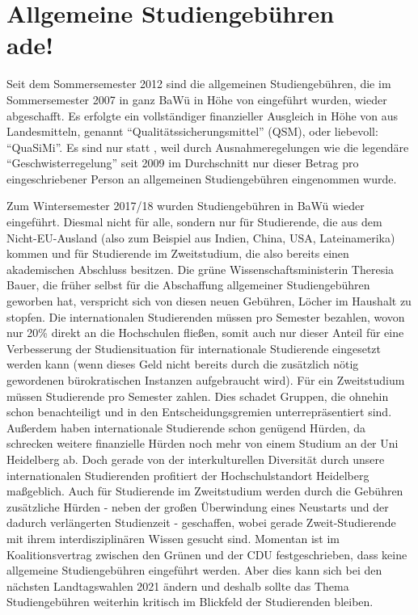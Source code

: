 \section[Allgemeine Studiengebühren ade]{Allgemeine Studiengebühren \\ade!}


Seit dem Sommersemester 2012 sind die allgemeinen Studiengebühren, die im Sommersemester 2007 in ganz BaWü in Höhe von  eingeführt wurden, wieder abgeschafft. Es erfolgte ein vollständiger finanzieller Ausgleich in Höhe von  aus Landesmitteln, genannt “Qualitätssicherungsmittel” (QSM), oder liebevoll: “QuaSiMi”. Es sind nur  statt , weil durch Ausnahmeregelungen wie die legendäre “Geschwisterregelung” seit 2009 im Durchschnitt nur dieser Betrag pro eingeschriebener Person an allgemeinen Studiengebühren eingenommen wurde.

Zum Wintersemester 2017/18 wurden Studiengebühren in BaWü wieder eingeführt. Diesmal nicht für alle, sondern nur für Studierende, die aus dem Nicht-EU-Ausland (also zum Beispiel aus Indien, China, USA, Lateinamerika) kommen und für Studierende im Zweitstudium, die also bereits einen akademischen Abschluss besitzen. Die grüne Wissenschaftsministerin Theresia Bauer, die früher selbst für die Abschaffung allgemeiner Studiengebühren geworben hat, verspricht sich von diesen neuen Gebühren, Löcher im Haushalt zu stopfen. Die internationalen Studierenden müssen  pro Semester bezahlen, wovon nur 20\% direkt an die Hochschulen fließen, somit auch nur dieser Anteil für eine Verbesserung der Studiensituation für internationale Studierende eingesetzt werden kann (wenn dieses Geld nicht bereits durch die zusätzlich nötig gewordenen bürokratischen Instanzen aufgebraucht wird). Für ein Zweitstudium müssen Studierende  pro Semester zahlen. Dies schadet Gruppen, die ohnehin schon benachteiligt und in den Entscheidungsgremien unterrepräsentiert sind. Außerdem haben internationale Studierende schon genügend Hürden, da schrecken weitere finanzielle Hürden noch mehr von einem Studium an der Uni Heidelberg ab. Doch gerade von der interkulturellen Diversität durch unsere internationalen Studierenden profitiert der Hochschulstandort Heidelberg maßgeblich. Auch für Studierende im Zweitstudium werden durch die Gebühren zusätzliche Hürden - neben der großen Überwindung eines Neustarts und der dadurch verlängerten Studienzeit - geschaffen, wobei gerade Zweit-Studierende mit ihrem interdisziplinären Wissen gesucht sind. Momentan ist im Koalitionsvertrag zwischen den Grünen und der CDU festgeschrieben, dass keine allgemeine Studiengebühren eingeführt werden. Aber dies kann sich bei den nächsten Landtagswahlen 2021 ändern und deshalb sollte das Thema Studiengebühren weiterhin kritisch im Blickfeld der Studierenden bleiben.

